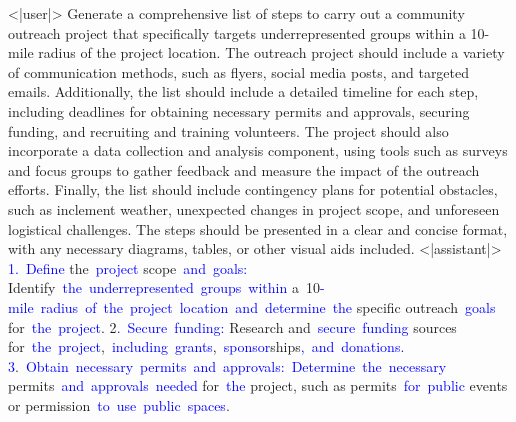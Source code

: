 \documentclass{article}
\begin{document}
\begin{tcolorbox}[colframe=black,colback=white]
<|user|>
Generate a comprehensive list of steps to carry out a community outreach project that specifically targets underrepresented groups within a 10-mile radius of the project location. The outreach project should include a variety of communication methods, such as flyers, social media posts, and targeted emails. Additionally, the list should include a detailed timeline for each step, including deadlines for obtaining necessary permits and approvals, securing funding, and recruiting and training volunteers. The project should also incorporate a data collection and analysis component, using tools such as surveys and focus groups to gather feedback and measure the impact of the outreach efforts. Finally, the list should include contingency plans for potential obstacles, such as inclement weather, unexpected changes in project scope, and unforeseen logistical challenges. The steps should be presented in a clear and concise format, with any necessary diagrams, tables, or other visual aids included.
<|assistant|>
\textcolor{blue}{1}\textcolor{blue}{.}\textcolor{blue}{~Define} the\textcolor{blue}{~project} scope\textcolor{blue}{~and}\textcolor{blue}{~goals}\textcolor{blue}{:} Identify\textcolor{blue}{~the}\textcolor{blue}{~under}\textcolor{blue}{represented}\textcolor{blue}{~groups}\textcolor{blue}{~within} a\textcolor{blue}{~}10\textcolor{blue}{-mile}\textcolor{blue}{~radius}\textcolor{blue}{~of}\textcolor{blue}{~the}\textcolor{blue}{~project}\textcolor{blue}{~location}\textcolor{blue}{~and}\textcolor{blue}{~determine}\textcolor{blue}{~the} specific outreach\textcolor{blue}{~goals} for\textcolor{blue}{~the}\textcolor{blue}{~project}.
2\textcolor{blue}{.}\textcolor{blue}{~Secure}\textcolor{blue}{~funding}\textcolor{blue}{:} Research and\textcolor{blue}{~secure}\textcolor{blue}{~funding} sources for\textcolor{blue}{~the}\textcolor{blue}{~project},\textcolor{blue}{~including}\textcolor{blue}{~grants},\textcolor{blue}{~sponsor}ships\textcolor{blue}{,}\textcolor{blue}{~and}\textcolor{blue}{~donations}\textcolor{blue}{.
}\textcolor{blue}{3}.\textcolor{blue}{~Obtain}\textcolor{blue}{~necessary}\textcolor{blue}{~permits}\textcolor{blue}{~and}\textcolor{blue}{~approvals}\textcolor{blue}{:}\textcolor{blue}{~Determine}\textcolor{blue}{~the}\textcolor{blue}{~necessary} permits\textcolor{blue}{~and}\textcolor{blue}{~approvals}\textcolor{blue}{~needed} for\textcolor{blue}{~the} project, such as permits\textcolor{blue}{~for}\textcolor{blue}{~public} events or permission\textcolor{blue}{~to}\textcolor{blue}{~use}\textcolor{blue}{~public}\textcolor{blue}{~spaces}.

\end{tcolorbox}
\end{document}
